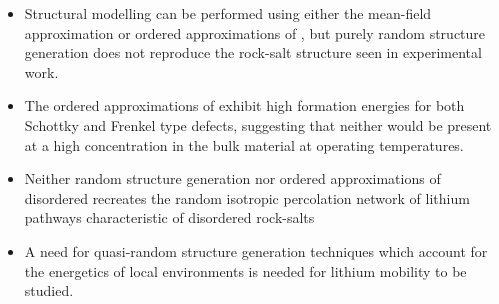 \begin{itemize}
	\item Structural modelling can be performed using either the mean-field approximation or ordered approximations of , but purely random structure generation does not reproduce the rock-salt structure seen in experimental work.
	\item The ordered approximations of  exhibit high formation energies for both Schottky and Frenkel type defects, suggesting that neither would be present at a high concentration in the bulk material at operating temperatures.
	
	\item Neither random structure generation nor ordered approximations of disordered  recreates the random isotropic percolation network of lithium pathways characteristic of disordered rock-salts
	\item A need for quasi-random structure generation techniques which account for the energetics of local environments is needed for  lithium mobility to be studied.
\end{itemize}



\newpage
